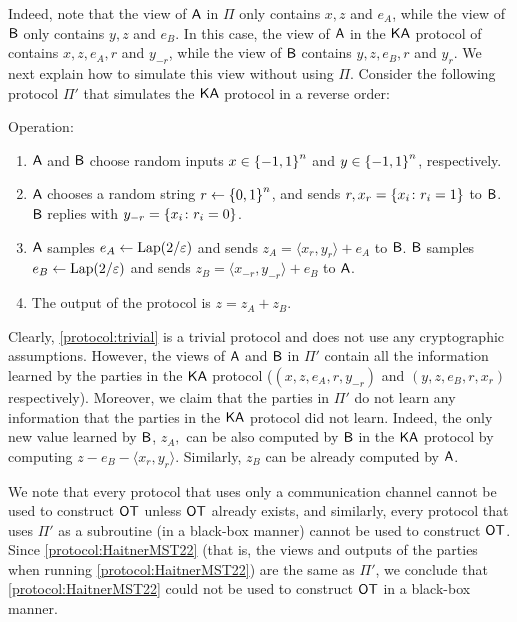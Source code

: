 Indeed, note that the view of $\mathsf{A}$ in $\Pi$ only contains $x,z$ and  $e_A$, while the view of $\mathsf{B}$ only contains $y,z$ and $e_B$. In this case, the view of $\mathsf{A}$ in the ${\sf KA}$ protocol of \cite{HaitnerMST22} contains $x,z, e_A, r$ and $y_{-r}$, while the view of $\mathsf{B}$ contains $y,z, e_B, r$ and $y_{r}$.
We next explain how to simulate this view without using $\Pi$. Consider the following protocol $\Pi'$ that  simulates the ${\sf KA}$ protocol in a reverse order:

\begin{protocol}\label{protocol:trivial}
    \item Operation:~
    \begin{enumerate}
        \item $\mathsf{A}$ and $\mathsf{B}$ choose random inputs $x\in \set{-1,1}^n$ and $y\in \set{-1,1}^n$, respectively.
               \item $\mathsf{A}$ chooses a random string $r \gets \zn$, and sends $r, x_r=\set{x_i \colon r_i=1}$ to $\mathsf{B}$. $\mathsf{B}$ replies with $y_{- r}=\set{x_i \colon r_i=0}$.
               \item $\mathsf{A}$ samples $e_A\gets {\rm Lap}(2/\varepsilon)$ and sends $z_A=\langle x_{r},y_r\rangle + e_A$  to $\mathsf{B}$. $\mathsf{B}$ samples $e_B\gets {\rm Lap}(2/\varepsilon)$ and sends $z_B=\langle x_{-r},y_{-r}\rangle + e_B$  to $\mathsf{A}$.
        \item The output of the protocol is $z=z_A+z_B$.
\end{enumerate}
\end{protocol}
Clearly, \cref{protocol:trivial} is a trivial protocol and does not use any cryptographic assumptions. However, the views of $\mathsf{A}$ and $\mathsf{B}$ in $\Pi'$ contain all the information learned by the parties in the ${\sf KA}$ protocol ($(x,z,e_A,r,y_{-r})$ and $(y,z,e_B,r,x_{r})$ respectively). Moreover, we claim that the parties in $\Pi'$ do not learn any information that the parties in the ${\sf KA}$ protocol did not learn. Indeed, the only new value learned by $\mathsf{B}$, $z_A,$ can be also computed by $\mathsf{B}$ in the ${\sf KA}$ protocol by computing $z-e_B-\langle x_r,y_r \rangle$. Similarly, $z_B$ can be already computed by $\mathsf{A}$. 

We note that every protocol that uses only a communication channel cannot be used to construct ${\sf OT}$ unless ${\sf OT}$ already exists, and similarly, every protocol that uses  $\Pi'$ as a subroutine (in a black-box manner) cannot be used to construct ${\sf OT}$. Since \cref{protocol:HaitnerMST22} (that is, the views and outputs of the parties when running \cref{protocol:HaitnerMST22}) are the same as $\Pi'$, we conclude that \cref{protocol:HaitnerMST22} could not be used to construct ${\sf OT}$ in a black-box manner.  



